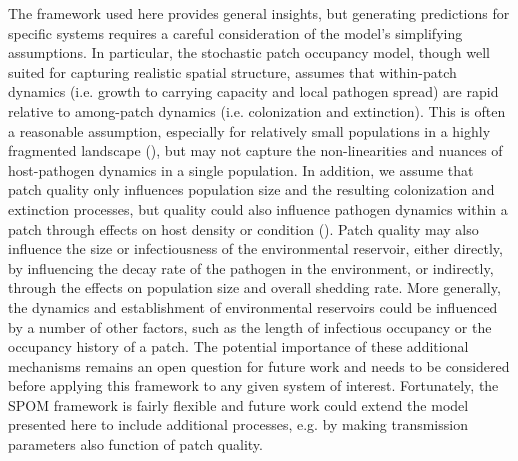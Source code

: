 \documentclass{article}
\begin{document}
The framework used here provides general insights, but generating predictions for specific systems requires a careful consideration of the model's simplifying assumptions.
In particular, the stochastic patch occupancy model, though well suited for capturing realistic spatial structure, assumes that within-patch dynamics (i.e. growth to carrying capacity and local pathogen spread) are rapid relative to among-patch dynamics (i.e. colonization and extinction).
This is often a reasonable assumption, especially for relatively small populations in a highly fragmented landscape (\cite{Hanski2003}), but may not capture the non-linearities and nuances of host-pathogen dynamics in a single population.
In addition, we assume that patch quality only influences population size and the resulting colonization and extinction processes, but quality could also influence pathogen dynamics within a patch through effects on host density or condition (\cite{Becker2015}).
Patch quality may also influence the size or infectiousness of the environmental reservoir, either directly, by influencing the decay rate of the pathogen in the environment, or indirectly, through the effects on population size and overall shedding rate.
More generally, the dynamics and establishment of environmental reservoirs could be influenced by a number of other factors, such as the length of infectious occupancy or the occupancy history of a patch.
The potential importance of these additional mechanisms remains an open question for future work and needs to be considered before applying this framework to any given system of interest.
Fortunately, the SPOM framework is fairly flexible and future work could extend the model presented here to include additional processes, e.g. by making transmission parameters also function of patch quality.
\end{document}
